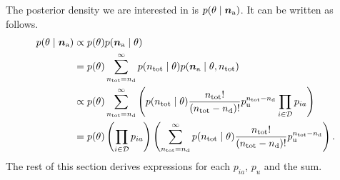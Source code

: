 \documentclass[thesis.tex]{subfiles}
\begin{document}
The posterior density we are interested in is $p(\theta \mid \bm{n_\text{a}})$.
It can be written as follows.
\begin{align}
p(\theta \mid \bm{n_\text{a}})
&\propto p(\theta) p(\bm{n_\text{a}} \mid \theta) \\
&= p(\theta) \sum_{n_\text{tot}=n_\text{d}}^\infty p(n_\text{tot} \mid \theta) p(\bm{n_\text{a}} \mid \theta, n_\text{tot}) \\
&\propto p(\theta) \sum_{n_\text{tot}=n_\text{d}}^\infty \left( p(n_\text{tot} \mid \theta) \frac{n_\text{tot}!}{(n_\text{tot} - n_\text{d})!} p_\text{u}^{n_\text{tot} - n_\text{d}} \prod_{i \in \mathcal{D}} p_{ia} \right) \\
&= p(\theta) \left( \prod_{i \in \mathcal{D}} p_{ia} \right) \left( \sum_{n_\text{tot}=n_\text{d}}^\infty p(n_\text{tot} \mid \theta) \frac{n_\text{tot}!}{(n_\text{tot} - n_\text{d})!} p_\text{u}^{n_\text{tot} - n_\text{d}} \right) \label{perf-test:eq:full-posterior}.
\end{align}
The rest of this section derives expressions for each $p_{ia}$, $p_{u}$ and the sum.
\end{document}
